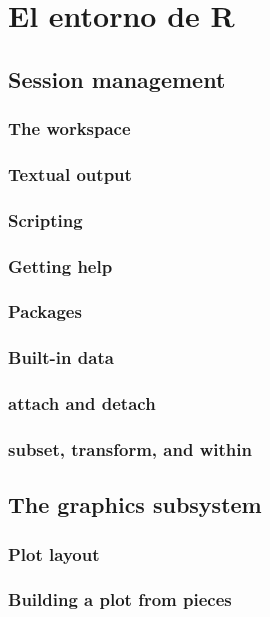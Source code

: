 \documentclass[spanish]{extbook}
\numberwithin{equation}{section}
\numberwithin{figure}{section}
\begin{document}
\chapter{El entorno de R}

\section{Session management}
\subsection{The workspace}
\subsection{Textual output}
\subsection{Scripting	}
\subsection{Getting help}
\subsection{Packages}
\subsection{Built-in data}
\subsection{attach and detach}
\subsection{subset, transform, and within}

\section{The graphics subsystem}
\subsection{Plot layout}
\subsection{Building a plot from pieces}
\end{document}
